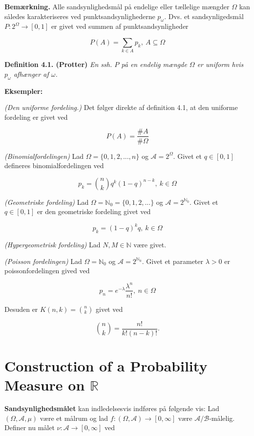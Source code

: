 \documentclass[a4paper,10pt,openany]{book}
\begin{document}
\textbf{Bemærkning.} Alle sandsynlighedsmål på endelige eller tællelige mængder \(\Omega\) kan således karakteriseres ved punktsandsynlighederne \(p_\omega\). Dvs. et sandsynligedsmål \(P : 2^\Omega \to [0,1]\) er givet ved summen af punktsandsynligheder

\[
P(A)=\sum_{k\in A}p_k,\ A\subseteq\Omega
\]

\textbf{Definition 4.1. (Protter)} \emph{En ssh. \(P\) på en endelig mængde \(\Omega\) er uniform hvis \(p_\omega\) afhænger af \(\omega\).}

\textbf{Eksempler:}

\emph{(Den uniforme fordeling.)} Det følger direkte af definition 4.1, at den uniforme fordeling er givet ved

\[
P(A)=\frac{\#A}{\#\Omega}
\]

\emph{(Binomialfordelingen)} Lad \(\Omega=\{0,1,2,...,n\}\) og \(\mathcal{A}=2^\Omega\). Givet et \(q\in[0,1]\) defineres binomialfordelingen ved

\[
p_k={n\choose k}q^k(1-q)^{n-k},\ k\in\Omega
\]

\emph{(Geometriske fordeling)} Lad \(\Omega=\mathbb{N}_0=\{0,1,2,...\}\) og \(\mathcal{A}=2^{\mathbb{N}_0}\). Givet et \(q\in[0,1]\) er den geometriske fordeling givet ved

\[
p_k=(1-q)^kq,\ k\in\Omega
\]

\emph{(Hypergeometrisk fordeling)} Lad \(N,M\in\mathbb{N}\) være givet.

\emph{(Poisson fordelingen)} Lad \(\Omega=\mathbb{N}_0\) og \(\mathcal{A}=2^{\mathbb{N}_0}\). Givet et parameter \(\lambda>0\) er poissonfordelingen gived ved

\[
p_n=e^{-\lambda}\frac{\lambda^n}{n!},\ n\in\Omega
\]

Desuden er \(K(n,k)={n\choose k}\) givet ved

\[
{n\choose k}=\frac{n!}{k!(n-k)!}.
\]

\hypertarget{construction-of-a-probability-measure-on-mathbb-r}{%
\section{\texorpdfstring{Construction of a Probability Measure on \(\mathbb R\)}{Construction of a Probability Measure on \textbackslash mathbb R}}\label{construction-of-a-probability-measure-on-mathbb-r}}

\textbf{Sandsynlighedsmålet} kan indledelsesvis indføres på følgende vis: Lad \((\Omega, \mathcal{A},\mu)\) være et målrum og lad \(f : (\Omega,\mathcal{A}) \to [0,\infty]\) være \(\mathcal{A}/\mathcal{B}\)-målelig. Definer nu målet \(\nu : \mathcal{A} \to [0,\infty]\) ved
\end{document}
